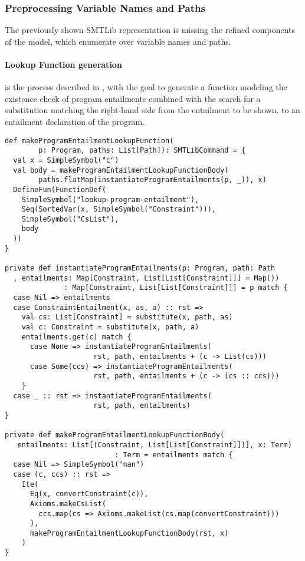 \subsubsection{Preprocessing Variable Names and Paths}
The previously shown SMTLib representation is
missing the refined components of the model,
which enumerate over variable names and paths.

\paragraph{Lookup Function generation}
is the process described in ,
with the goal to generate a function modeling
the existence check of program entailments
combined with the search for a substitution
matching the right-hand side from the entailment
to be shown, to an entailment declaration of the program.
%
\begin{lstlisting}[caption={Lookup Function Generation},label=lst:lookup,captionpos=b,frame={lines}]
def makeProgramEntailmentLookupFunction(
        p: Program, paths: List[Path]): SMTLibCommand = {
  val x = SimpleSymbol("c")
  val body = makeProgramEntailmentLookupFunctionBody(
        paths.flatMap(instantiateProgramEntailments(p, _)), x)
  DefineFun(FunctionDef(
    SimpleSymbol("lookup-program-entailment"),
    Seq(SortedVar(x, SimpleSymbol("Constraint"))),
    SimpleSymbol("CsList"),
    body
  ))
}

private def instantiateProgramEntailments(p: Program, path: Path
  , entailments: Map[Constraint, List[List[Constraint]]] = Map())
              : Map[Constraint, List[List[Constraint]]] = p match {
  case Nil => entailments
  case ConstraintEntailment(x, as, a) :: rst =>
    val cs: List[Constraint] = substitute(x, path, as)
    val c: Constraint = substitute(x, path, a)
    entailments.get(c) match {
      case None => instantiateProgramEntailments(
                     rst, path, entailments + (c -> List(cs)))
      case Some(ccs) => instantiateProgramEntailments(
                     rst, path, entailments + (c -> (cs :: ccs)))
    }
  case _ :: rst => instantiateProgramEntailments(
                     rst, path, entailments)
}

private def makeProgramEntailmentLookupFunctionBody(
   entailments: List[(Constraint, List[List[Constraint]])], x: Term)
                          : Term = entailments match {
  case Nil => SimpleSymbol("nan")
  case (c, ccs) :: rst =>
    Ite(
      Eq(x, convertConstraint(c)),
      Axioms.makeCsList(
        ccs.map(cs => Axioms.makeList(cs.map(convertConstraint)))
      ),
      makeProgramEntailmentLookupFunctionBody(rst, x)
    )
}
\end{lstlisting}
